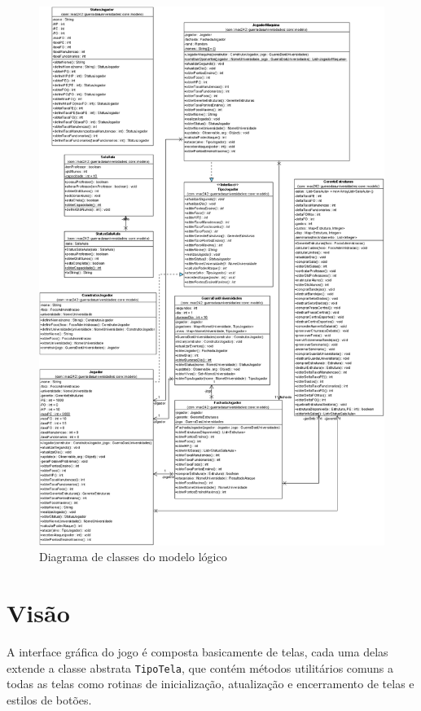 \documentclass[brazil,times]{abnt}
\begin{document}
\begin{figure}[htp]
\begin{center}
  \includegraphics[width=\textwidth]{imagens/ModeloBasico.png}
  \caption[Diagrama de classes do modelo lógico]{Diagrama de
  classes do modelo lógico}
  \label{visao-basica}
\end{center}
\end{figure}

\section{Visão}
A interface gráfica do jogo é composta basicamente de telas, cada uma delas
extende a classe abstrata \texttt{TipoTela}, que contém métodos utilitários
comuns a todas as telas como rotinas de inicialização, atualização e
encerramento de telas e estilos de botões.
\end{document}
